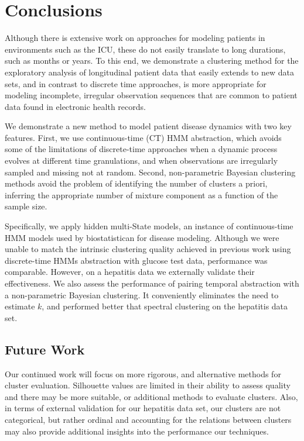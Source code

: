 \chapter{Conclusions}
\label{ch:conclusions}

Although there is extensive work on approaches for modeling patients in environments such as the ICU, these do not easily translate to long durations, such as months or years.  To this end, we demonstrate a clustering method for the exploratory analysis of longitudinal patient data that easily extends to new data sets, and in contrast to discrete time approaches, is more appropriate for modeling incomplete, irregular observation sequences that are common to patient data found in electronic health records.

We demonstrate a new method to model patient disease dynamics with two key features.  First, we use continuous-time (CT) HMM abstraction, which avoids some of the limitations of discrete-time approaches when a dynamic process evolves at different time granulations, and when observations are irregularly sampled and missing not at random.  Second, non-parametric Bayesian clustering methods avoid the problem of identifying the number of clusters a priori, inferring the appropriate number of mixture component as a function of the sample size.

Specifically, we apply hidden multi-State models, an instance of continuous-time HMM models used by biostatistican for disease modeling.  Although we were unable to match the intrinsic clustering quality achieved in previous work using discrete-time HMMs abstraction with glucose test data, performance was comparable.  However, on a hepatitis data we externally validate their effectiveness.  We also assess the performance of pairing temporal abstraction with a non-parametric Bayesian clustering.  It conveniently eliminates the need to estimate $k$, and  performed better that spectral clustering on the hepatitis data set.

\section{Future Work}

 Our continued work will focus on more rigorous, and alternative methods for cluster evaluation. Silhouette values are limited in their ability to assess quality and there may be more suitable, or additional methods to evaluate clusters.  Also, in terms of external validation for our hepatitis data set, our clusters are not categorical, but rather ordinal and accounting for the relations between clusters may also provide additional insights into the performance our techniques.




